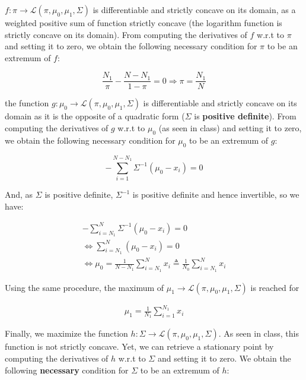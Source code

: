 \documentclass[11pt]{article}
\numberwithin{figure}{section} %
\begin{document}
$f:\pi \rightarrow \mathcal{L}(\pi, \mu_0, \mu_1, \Sigma)$ is differentiable and strictly concave on its domain, as a weighted positive sum of function strictly concave (the logarithm function is strictly concave on its domain). From computing the derivatives of $f$ w.r.t to $\pi$ and setting it to zero, we obtain the following necessary condition for $\pi$ to be an extremum of $f$:

\begin{equation}
\frac{N_1}{\pi} - \frac{N-N_1}{1-\pi} = 0 \Rightarrow \pi = \frac{N_1}{N} \tag{1}
\end{equation}

the function $g: \mu_0 \rightarrow \mathcal{L}(\pi, \mu_0, \mu_1, \Sigma)$ is differentiable and strictly concave on its domain as it is the opposite of a quadratic form ($\Sigma$ is \textbf{positive definite}). From computing the derivatives of $g$ w.r.t to $\mu_0$ (as seen in class) and setting it to zero, we obtain the following necessary condition for $\mu_0$ to be an extremum of $g$:

\begin{equation*}
- \sum\limits_{i=1}^{N-N_1} \Sigma^{-1} (\mu_0-x_i) = 0 
\end{equation*}

And, as $\Sigma$ is positive definite, $\Sigma^{-1}$ is positive definite and hence invertible, so we have:

\begin{align*}
- \sum\limits_{i=N_1}^{N} \Sigma^{-1} (\mu_0-x_i) = 0 \\
\Leftrightarrow \sum\limits_{i=N_1}^{N} (\mu_0-x_i) = 0 \\
\Leftrightarrow \mu_0 = \frac{1}{N-N_1} \sum\limits_{i=N_1}^{N} x_i \triangleq \frac{1}{N_0}\sum\limits_{i=N_1}^{N} x_i
\end{align*}

Using the same procedure, the maximum of $\mu_1 \rightarrow \mathcal{L}(\pi, \mu_0, \mu_1, \Sigma)$ is reached for


\begin{align*}
\mu_1 = \frac{1}{N_1}\sum\limits_{i=1}^{N_1} x_i
\end{align*}

Finally, we maximize the function $h: \Sigma \rightarrow \mathcal{L}(\pi, \mu_0, \mu_1, \Sigma)$. As seen in class, this function is not strictly concave.
Yet, we can retrieve a stationary point by computing the derivatives of $h$ w.r.t to $\Sigma$ and setting it to zero. We obtain the following \textbf{necessary} condition for $\Sigma$ to be an extremum of $h$:
\end{document}
